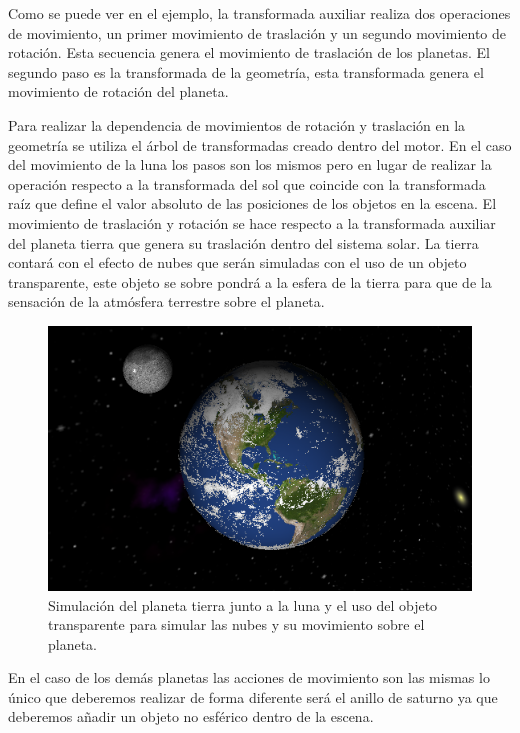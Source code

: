 \documentclass[a4paper, 17pt]{book}
\begin{document}
Como se puede ver en el ejemplo, la transformada auxiliar realiza dos operaciones de movimiento, un primer movimiento
de traslación y un segundo movimiento de rotación. Esta secuencia genera el movimiento de traslación de los planetas.
El segundo paso es la transformada de la geometría, esta transformada genera el movimiento de rotación del planeta.

Para realizar la dependencia de movimientos de rotación y traslación en la geometría se utiliza el árbol de transformadas
creado dentro del motor. En el caso del movimiento de la luna los pasos son los mismos pero en lugar de realizar la operación
respecto a la transformada del sol que coincide con la transformada raíz que define el valor absoluto de las posiciones de los
objetos en la escena. El movimiento de traslación y rotación se hace respecto a la transformada auxiliar del planeta tierra
que genera su traslación dentro del sistema solar. La tierra contará con el efecto de nubes que serán simuladas con el uso
de un objeto transparente, este objeto se sobre pondrá a la esfera de la tierra para que de la sensación de la atmósfera
terrestre sobre el planeta.

\begin{figure}[hbt!]
    \centering
    \includegraphics[scale=0.35, keepaspectratio]{img/Earth.png}
    \caption{Simulación del planeta tierra junto a la luna y el uso del objeto transparente para simular las nubes y su
    movimiento sobre el planeta.}
    \label{figura:Earth}
\end{figure}

En el caso de los demás planetas las acciones de movimiento son las mismas lo único que deberemos realizar de forma diferente
será el anillo de saturno ya que deberemos añadir un objeto no esférico dentro de la escena.
\end{document}
